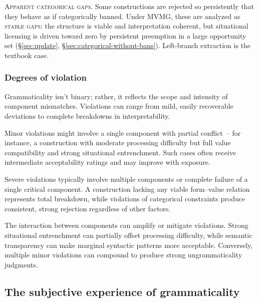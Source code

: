 \documentclass[12pt,letterpaper]{article}
\newcommand{\term}[1]{\textsc{#1}}
\begin{document}
\textsc{Apparent categorical gaps.}\label{sec:stable-gaps}
Some constructions are rejected so persistently that they behave as if categorically banned. Under MVMG, these are analyzed as \term{stable gaps}: the structure is viable and interpretation coherent, but situational licensing is driven toward zero by persistent preemption in a large opportunity set (\S\ref{sec:update}, \S\ref{sec:categorical-without-bans}). Left-branch extraction is the textbook case.

\subsubsection{Degrees of violation}\label{sec:degrees}

Grammaticality isn't binary; rather, it reflects the scope and intensity of component mismatches. Violations can range from mild, easily recoverable deviations to complete breakdowns in interpretability.

Minor violations might involve a single component with partial conflict~-- for instance, a construction with moderate processing difficulty but full value compatibility and strong situational entrenchment. Such cases often receive intermediate acceptability ratings and may improve with exposure.

Severe violations typically involve multiple components or complete failure of a single critical component. A construction lacking any viable form--value relation represents total breakdown, while violations of categorical constraints produce consistent, strong rejection regardless of other factors.

The interaction between components can amplify or mitigate violations. Strong situational entrenchment can partially offset processing difficulty, while semantic transparency can make marginal syntactic patterns more acceptable. Conversely, multiple minor violations can compound to produce strong ungrammaticality judgments.

\subsection{The subjective experience of grammaticality}\label{sec:subjective}
\end{document}
